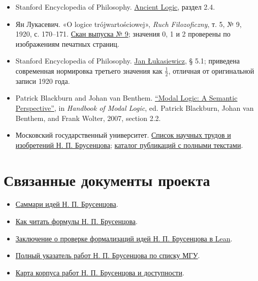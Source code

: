 \documentclass[12pt,a4paper]{article}
\begin{document}
\begin{itemize}
\item Stanford Encyclopedia of Philosophy. \href{https://plato.stanford.edu/archives/sum2025/entries/logic-ancient/}{Ancient Logic}, раздел 2.4.
\item Ян Лукасевич. «O logice trójwartościowej», \emph{Ruch Filozoficzny}, т. 5, № 9, 1920, с. 170–171. \href{https://kpbc.umk.pl/Content/247342/PDF/EOD_OPEN_006_12_nr_09.pdf}{Скан выпуска № 9}; значения 0, 1 и 2 проверены по изображениям печатных страниц.
\item Stanford Encyclopedia of Philosophy. \href{https://plato.stanford.edu/entries/lukasiewicz/}{Jan Łukasiewicz}, § 5.1; приведена современная нормировка третьего значения как \(\tfrac12\), отличная от оригинальной записи 1920 года.
\item Patrick Blackburn and Johan van Benthem. \href{https://doi.org/10.1016/S1570-2464(07)80004-8}{“Modal Logic: A Semantic Perspective”}, in \emph{Handbook of Modal Logic}, ed. Patrick Blackburn, Johan van Benthem, and Frank Wolter, 2007, section 2.2.
\item Московский государственный университет. \href{https://ternarycomp.cs.msu.ru/Brusentsov/Brusentsov_v2.html}{Список научных трудов и изобретений Н. П. Брусенцова}; \href{https://ternarycomp.cs.msu.ru/all.html}{каталог публикаций с полными текстами}.
\end{itemize}
\section{Связанные документы проекта}

\begin{itemize}
\item \href{../docs/Саммари-идей-Брусенцова.tex}{Саммари идей Н. П. Брусенцова}.
\item \href{../docs/Как-читать-формулы-Брусенцова.tex}{Как читать формулы Н. П. Брусенцова}.
\item \href{Проверка-идей-Брусенцова-в-Lean.tex}{Заключение о проверке формализаций идей Н. П. Брусенцова в Lean}.
\item \href{Полный-указатель-трудов-Брусенцова.md}{Полный указатель работ Н. П. Брусенцова по списку МГУ}.
\item \href{Карта-работ-Брусенцова.tex}{Карта корпуса работ Н. П. Брусенцова и доступности}.
\end{itemize}
\end{document}
